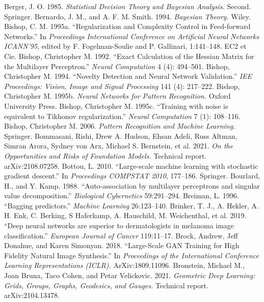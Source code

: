  Berger, J. O. 1985. \emph{Statistical Decision Theory and Bayesian Analysis.} Second. Springer.
 Bernardo, J. M., and A. F. M. Smith. 1994. \emph{Bayesian Theory.} Wiley.
 Bishop, C. M. 1995a. ``Regularization and Complexity Control in Feed-forward Networks.'' In \emph{Proceedings International Conference on Artificial Neural Networks ICANN'95}, edited by F. Fogelman-Soulie and P. Gallinari, 1:141--148. EC2 et Cie.
 Bishop, Christopher M. 1992. ``Exact Calculation of the Hessian Matrix for the Multilayer Perceptron.'' \emph{Neural Computation} 4 (4): 494--501.
 Bishop, Christopher M. 1994. ``Novelty Detection and Neural Network Validation.'' \emph{IEE Proceedings: Vision, Image and Signal Processing} 141 (4): 217--222.
 Bishop, Christopher M. 1995b. \emph{Neural Networks for Pattern Recognition.} Oxford University Press.
 Bishop, Christopher M. 1995c. ``Training with noise is equivalent to Tikhonov regularization.'' \emph{Neural Computation} 7 (1): 108--116.
 Bishop, Christopher M. 2006. \emph{Pattern Recognition and Machine Learning.} Springer.
 Bommasani, Rishi, Drew A. Hudson, Ehsan Adeli, Russ Altman, Simran Arora, Sydney von Arx, Michael S. Bernstein, et al. 2021. \emph{On the Opportunities and Risks of Foundation Models.} Technical report. arXiv:2108.07258.
 Bottou, L. 2010. ``Large-scale machine learning with stochastic gradient descent.'' In \emph{Proceedings COMPSTAT 2010}, 177--186. Springer.
 Bourlard, H., and Y. Kamp. 1988. ``Auto-association by multilayer perceptrons and singular value decomposition.'' \emph{Biological Cybernetics} 59:291--294.
 Breiman, L. 1996. ``Bagging predictors.'' \emph{Machine Learning} 26:123--140.
 Brinker, T. J., A. Hekler, A. H. Enk, C. Berking, S Haferkamp, A. Hauschild, M. Weichenthal, et al. 2019. ``Deep neural networks are superior to dermatologists in melanoma image classification.'' \emph{European Journal of Cancer} 119:11--17.
 Brock, Andrew, Jeff Donahue, and Karen Simonyan. 2018. ``Large-Scale GAN Training for High Fidelity Natural Image Synthesis.'' In \emph{Proceedings of the International Conference Learning Representations (ICLR).} ArXiv:1809.11096.
 Bronstein, Michael M., Joan Bruna, Taco Cohen, and Petar Velickovic. 2021. \emph{Geometric Deep Learning: Grids, Groups, Graphs, Geodesics, and Gauges.} Technical report. arXiv:2104.13478.
